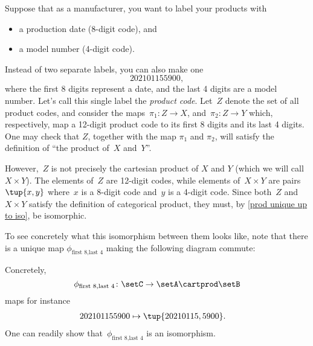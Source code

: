 \begin{example}
    \label{ex:univ-prop-prod}
    Suppose that as a manufacturer, you want to label your products with
    \begin{itemize}
        \item a production date (8-digit code), and
        \item a model number (4-digit code).
    \end{itemize}
    Instead of two separate labels, you can also make one
    \begin{equation}
        \label{eq:exa-prod-univ-prop-code}
        202101155900,
    \end{equation}
    where the first 8 digits represent a date, and the last 4 digits are a model number.
    Let's call this single label the \emph{product code}.
    Let~$Z$ denote the set of all product codes, and consider the maps~$\pi_1\colon Z\to X$, and~$\pi_2\colon Z\to Y$ which, respectively, map a 12-digit product code to its first 8 digits and its last 4 digits.
    One may check that $Z$, together with the map $\pi_1$ and $\pi_2$, will satisfy the definition of ``the product of~$X$ and~$Y$''.
    
    \begin{center}
    \end{center}
    
    However,~$Z$ is not precisely the cartesian product of $X$ and $Y$ (which we will call $X\times Y$).
    The elements of~$Z$ are 12-digit codes, while elements of~$X\times Y$ are pairs~$\tup{x,y}$ where~$x$ is a 8-digit code and~$y$ is a 4-digit code.
    Since both~$Z$ and~$X\times Y$ satisfy the definition of categorical product, they must, by \cref{prod unique up to iso}, be isomorphic.
    
    \begin{center}
    \end{center}

    To see concretely what this isomorphism between them looks like, note that there is a unique map $\phi_{\text{first 8},\text{last 4}}$ making the following diagram commute:

    \begin{center}
    \end{center}

    Concretely,~
    \begin{equation}
        \label{eq:exa-univ-iso}
        \phi_{\text{first 8},\text{last 4}}\colon \setC \to \setA\cartprod \setB
    \end{equation}
    maps for instance
    \begin{equation}
        \label{eq:exa-univ-iso-concrete}
        \begin{aligned}
            202101155900 & \mapsto \tup{20210115,5900}.
        \end{aligned}
    \end{equation}
    One can readily show that~$\phi_{\text{first 8},\text{last 4}}$ is an isomorphism.
\end{example}

